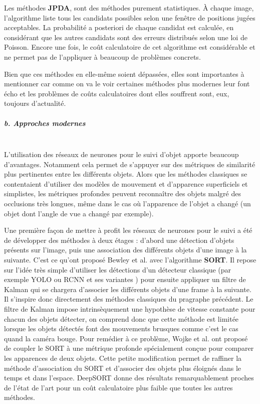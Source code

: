 \documentclass[10pt,twocolumn,letterpaper,french]{article}
\begin{document}
Les méthodes \textbf{JPDA}, \cite{FortmannJPDA, JPDArevisited} sont des méthodes purement statistiques. À chaque image, l'algorithme liste tous les candidats possibles selon une fenêtre de positions jugées acceptables. La probabilité a posteriori de chaque candidat est calculée, en considérant que les autres candidats sont des erreurs distribués selon une loi de Poisson. Encore une fois, le coût calculatoire de cet algorithme est considérable et ne permet pas de l'appliquer à beaucoup de problèmes concrets.

Bien que ces méthodes en elle-même soient dépassées, elles sont importantes à mentionner car comme on va le voir certaines méthodes plus modernes leur font écho et les problèmes de coûts calculatoires dont elles souffrent sont, eux, toujours d'actualité.

\subparagraph{b. Approches modernes\\\\} 

L'utilisation des réseaux de neurones pour le suivi d'objet apporte beaucoup d'avantages. Notamment cela permet de s'appuyer sur des métriques de similarité plus pertinentes entre les différents objets. Alors que les méthodes classiques se contentaient d'utiliser des modèles de mouvement et d'apparence superficiels et simplistes, les métriques profondes peuvent reconnaître des objets malgré des occlusions très longues, même dans le cas où l'apparence de l'objet a changé (un objet dont l'angle de vue a changé par exemple).

Une première façon de mettre à profit les réseaux de neurones pour le suivi a été de développer des méthodes à deux étages : d'abord une détection d'objets présents sur l'image, puis une association des différents objets d'une image à la suivante. C'est ce qu'ont proposé Bewley et al. \cite{SORT} avec l'algorithme \textbf{SORT}. Il repose sur l'idée très simple d'utiliser les détections d'un détecteur classique (par exemple YOLO \cite{redmon2016look} ou RCNN et ses variantes \cite{girshick2014rich, girshick2015fast, ren2016faster}) pour ensuite appliquer un filtre de Kalman qui se chargera d'associer les différents objets d'une frame à la suivante. Il s'inspire donc directement des méthodes classiques du pragraphe précédent. Le filtre de Kalman impose intrinsèquement une hypothèse de vitesse constante pour chacun des objets détecter, on comprend donc que cette méthode est limitée lorsque les objets détectés font des mouvements brusques comme c'est le cas quand la caméra bouge. Pour remédier à ce problème, Wojke et al. \cite{deepSORT} ont proposé de coupler le SORT à une métrique profonde spécialement conçue pour comparer les apparences de deux objets. Cette petite modification permet de raffiner la méthode d'association du SORT et d'associer des objets plus éloignés dans le temps et dans l'espace. DeepSORT donne des résultats remarquablement proches de l'état de l'art pour un coût calculatoire plus faible que toutes les autres méthodes.
\end{document}
